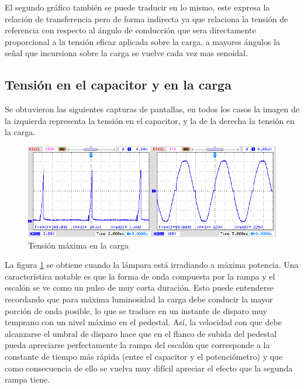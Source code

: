 \documentclass{article}
\begin{document}
El segundo gráfico también se puede traducir en lo mismo, este expresa la relación de transferencia pero de forma indirecta ya que relaciona la tensión de referencia con respecto al ángulo de conducción que sera directamente proporcional a la tensión eficaz aplicada sobre la carga, a mayores ángulos la señal que incursiona sobre la carga se vuelve cada vez mas senoidal.
\subsection{Tensión en el capacitor y en la carga}
Se obtuvieron las siguientes capturas de pantallas, en todos los casos la imagen de la izquierda representa la tensión en el capacitor, y la de la derecha la tensión en la carga.
%
\begin{figure}[h]
 \begin{center}
	\includegraphics[width=\textwidth]{imagenes/fig5.jpg} 
	\caption{Tensión máxima en la carga}\label{fig:fig5}
 \end{center}
\end{figure}
%
La figura \textcolor{blue}{\ref{fig:fig5}} se obtiene cuando la lámpara está irradiando a máxima potencia. Una característica notable es que la forma de onda compuesta por la rampa y el escalón se ve como un pulso de muy corta duración. Esto puede entenderse recordando que para máxima luminosidad la carga debe conducir la mayor porción de onda posible, lo que se traduce en un instante de disparo muy temprano con un nivel máximo en el pedestal. Así, la velocidad con que debe alcanzarse el umbral de disparo hace que en el flanco de subida del pedestal pueda apreciarse perfectamente la rampa del escalón que corresponde a la constante de tiempo más rápida (entre el capacitor y el potenciómetro) y que como consecuencia de ello se vuelva muy difícil apreciar el efecto que la segunda rampa tiene.
\end{document}

